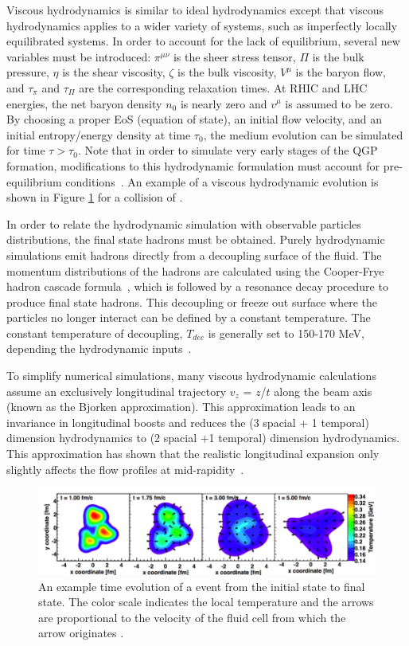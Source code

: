 Viscous hydrodynamics is similar to ideal hydrodynamics except that viscous hydrodynamics applies to a wider variety of systems, such as imperfectly locally equilibrated systems. In order to account for the lack of equilibrium, several new variables must be introduced: $\pi^{\mu\nu}$ is the sheer stress tensor, $\Pi$ is the bulk pressure, $\eta$ is the shear viscosity, $\zeta$ is the bulk viscosity, $V^\mu$ is the baryon flow, and $\tau_\pi$ and $\tau_\Pi$ are the corresponding relaxation times. At RHIC and LHC energies, the net baryon density $n_0$ is nearly zero and $v^\mu$ is assumed to be zero. By choosing a proper EoS (equation of state), an initial flow velocity, and an initial entropy/energy density at time $\tau_0$, the medium evolution can be simulated for time $\tau > \tau_0$. Note that in order to simulate very early stages of the QGP formation, modifications to this hydrodynamic formulation must account for pre-equilibrium conditions~\cite{Song2015}. An example of a viscous hydrodynamic evolution is shown in Figure \ref{fig:heau_sim_evolve} for a collision of \hau.

In order to relate the hydrodynamic simulation with observable particles distributions, the final state hadrons must be obtained. Purely hydrodynamic simulations emit hadrons directly from a decoupling surface of the fluid. The momentum distributions of the hadrons are calculated using the Cooper-Frye hadron cascade formula~\cite{PhysRevD.10.186}, which is followed by a resonance decay procedure to produce final state hadrons. This decoupling or freeze out surface where the particles no longer interact can be defined by a constant temperature. The constant temperature of decoupling, $T_{dec}$ is generally set to 150-170 MeV, depending the hydrodynamic inputs~\cite{Kolb:2003dz}.

To simplify numerical simulations, many viscous hydrodynamic calculations assume an exclusively longitudinal trajectory $v_z$ = $z$/$t$ along the beam axis (known as the Bjorken approximation). This approximation leads to an invariance in longitudinal boosts and reduces the (3 spacial + 1 temporal) dimension hydrodynamics to (2 spacial +1 temporal) dimension hydrodynamics. This approximation has shown that the realistic longitudinal expansion only slightly affects the flow profiles at mid-rapidity~\cite{Song2015}. 

\begin{figure}[h!]
\begin{center}
\includegraphics[width=0.69\linewidth]{figs/he3au_simulation.png}
\caption{An example time evolution of a \hau event from the initial state to final state. The color scale indicates the local temperature and the arrows are proportional to the velocity of the fluid cell from which the arrow originates \cite{PhysRevLett.113.112301}.}
\label{fig:heau_sim_evolve}
\end{center}
\end{figure}

